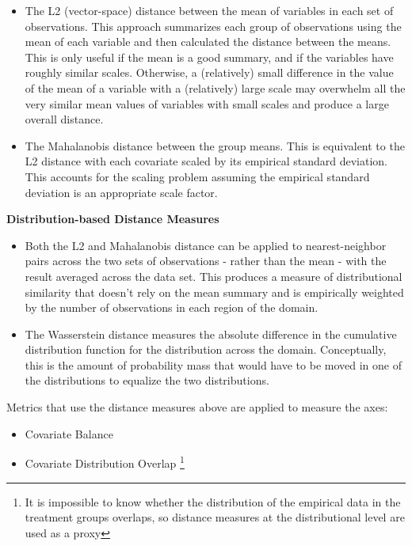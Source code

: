 \documentclass[../main.tex]{subfiles}
\begin{document}
\begin{enumerate}
\begin{itemize}
        \item The L2 (vector-space) distance between the mean of variables in each set of observations. This approach summarizes each group of observations using the mean of each variable and then calculated the distance between the means. This is only useful if the mean is a good summary, and if the variables have roughly similar scales. Otherwise, a (relatively) small difference in the value of the mean of a variable with a (relatively) large scale may overwhelm all the very similar mean values of variables with small scales and produce a large overall distance.

        \item The Mahalanobis distance between the group means. This is equivalent to the L2 distance with each covariate scaled by its empirical standard deviation. This accounts for the scaling problem assuming the empirical standard deviation is an appropriate scale factor.
    \end{itemize}

    \textbf{Distribution-based Distance Measures}

    \begin{itemize}
        \item Both the L2 and Mahalanobis distance can be applied to nearest-neighbor pairs across the two sets of observations - rather than the mean - with the result averaged across the data set. This produces a measure of distributional similarity that doesn't rely on the mean summary and is empirically weighted by the number of observations in each region of the domain.

        \item The Wasserstein distance measures the absolute difference in the cumulative distribution function for the distribution across the domain. Conceptually, this is the amount of probability mass that would have to be moved in one of the distributions to equalize the two distributions.
    \end{itemize}

    Metrics that use the distance measures above are applied to measure the axes:

    \begin{itemize}
        \item Covariate Balance
        \item Covariate Distribution Overlap \footnote{It is impossible to know whether the distribution of the empirical data in the treatment groups overlaps, so distance measures at the distributional level are used as a proxy}
    \end{itemize}


\end{enumerate}
\end{document}
